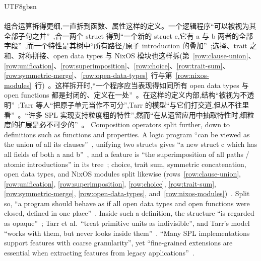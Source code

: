 \begin{CJK*}{UTF8}{gbsn}
\paragraph{}
\ifPaperChinese
组合运算拆得更细,一直拆到函数、属性这样的定义。一个逻辑程序``可以被视为其全部子句之并''~\cite[第~447~页]{bugliesi1994-modularity-logic-programming},合一两个 struct 得到``一个新的 struct c,它有 a 与 b 两者的全部字段''~\cite{cue-authors-cue-specification},而一个特性是其树中``所有路径/原子 introduction 的叠加''~\cite[第~41~页]{apel2008-feature-algebra};选择、trait 之和、对称拼接、open data types 与 NixOS 模块也这样拆(第~\ref{row:clause-union}、\ref{row:unification}、\ref{row:superimposition}、\ref{row:choice}、\ref{row:trait-sum}、\ref{row:symmetric-merge}、\ref{row:open-data-types}~行与第~\ref{row:nixos-modules}~行)~\cite{dezani1996-filter-models-conjunctive-disjunctive, scharli2003-traits, harper1991-symmetric-record-concatenation, nixos-contributors-nixos-modules}。这样拆开时,``一个程序应当表现得如同所有 open data types 与 open functions 都是封闭的、定义在一处''~\cite[\S~2.4]{loh2006-open-data-types}。在这样的定义内部,结构``被视为不透明''~\cite[第~39~页]{apel2008-feature-algebra};Tarr 等人``把原子单元当作不可分'',Tarr 的模型``与它们打交道,但从不往里看''~\cite[第~111~页]{tarr1999-n-degrees-of-separation}。``许多 SPL 实现支持粒度粗的特性'',然而``在从遗留应用中抽取特性时,细粒度的扩展是必不可少的''~\cite{kastner2008-granularity-software-product-lines}。
\else
Composition operators split further, down to definitions such as functions and properties.
A logic program ``can be viewed as the union of all its
clauses''~\cite[p.~447]{bugliesi1994-modularity-logic-programming}, unifying two structs gives ``a new
struct c which has all fields of both a and b''~\cite{cue-authors-cue-specification}, and a feature is
``the superimposition of all paths / atomic introductions'' in its
tree~\cite[p.~41]{apel2008-feature-algebra}; choice, trait sum, symmetric concatenation, open data types,
and NixOS modules split likewise (rows~\ref{row:clause-union}, \ref{row:unification},
\ref{row:superimposition}, \ref{row:choice}, \ref{row:trait-sum}, \ref{row:symmetric-merge},
\ref{row:open-data-types}, and~\ref{row:nixos-modules})~\cite{dezani1996-filter-models-conjunctive-disjunctive, scharli2003-traits, harper1991-symmetric-record-concatenation, nixos-contributors-nixos-modules}.
Split so, ``a program should behave as if all open data types and open functions were closed, defined in
one place''~\cite[\S~2.4]{loh2006-open-data-types}.
Inside such a definition, the structure ``is regarded as opaque''~\cite[p.~39]{apel2008-feature-algebra};
Tarr et al.\ ``treat primitive units as indivisible'', and Tarr's model ``works with them, but never
looks inside them''~\cite[p.~111]{tarr1999-n-degrees-of-separation}.
``Many SPL implementations support features with coarse granularity'', yet ``fine-grained extensions are
essential when extracting features from legacy
applications''~\cite{kastner2008-granularity-software-product-lines}.
\fi


\end{CJK*}
